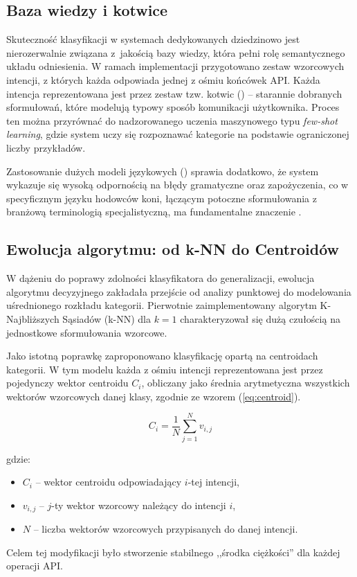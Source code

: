 \subsection*{Baza wiedzy i kotwice}

Skuteczność klasyfikacji w systemach dedykowanych dziedzinowo jest nierozerwalnie związana z~jakością bazy wiedzy, która pełni rolę semantycznego układu odniesienia. W ramach implementacji przygotowano zestaw wzorcowych intencji, z których każda odpowiada jednej z ośmiu końcówek API. Każda intencja reprezentowana jest przez zestaw tzw. kotwic () -- starannie dobranych sformułowań, które modelują typowy sposób komunikacji użytkownika. Proces ten można przyrównać do nadzorowanego uczenia maszynowego typu \textit{few-shot learning}, gdzie system uczy się rozpoznawać kategorie na podstawie ograniczonej liczby przykładów.

Zastosowanie {dużych modeli językowych} () sprawia dodatkowo, że system wykazuje się wysoką odpornością na błędy gramatyczne oraz zapożyczenia, co w specyficznym języku hodowców koni, łączącym potoczne sformułowania z branżową terminologią specjalistyczną, ma fundamentalne znaczenie \cite{wang2022}.

\subsection*{Ewolucja algorytmu: od k-NN do Centroidów}

W dążeniu do poprawy zdolności klasyfikatora do generalizacji, ewolucja algorytmu decyzyjnego zakładała przejście od analizy punktowej do modelowania uśrednionego rozkładu kategorii. Pierwotnie zaimplementowany algorytm K-Najbliższych Sąsiadów (k-NN) dla $k=1$ charakteryzował się dużą czułością na jednostkowe sformułowania wzorcowe.

Jako istotną poprawkę zaproponowano klasyfikację opartą na centroidach kategorii. W tym modelu każda z ośmiu intencji reprezentowana jest przez pojedynczy wektor centroidu $C_i$, obliczany jako średnia arytmetyczna wszystkich wektorów wzorcowych danej klasy, zgodnie ze wzorem (\ref{eq:centroid}).

\begin{equation}
    C_i = \frac{1}{N} \sum_{j=1}^{N} v_{i,j}
    \label{eq:centroid}
\end{equation}

\noindent gdzie:
\begin{itemize}
    \item $C_i$ -- wektor centroidu odpowiadający $i$-tej intencji,
    \item $v_{i,j}$ -- $j$-ty wektor wzorcowy należący do intencji $i$,
    \item $N$ -- liczba wektorów wzorcowych przypisanych do danej intencji.
\end{itemize}
Celem tej modyfikacji było stworzenie stabilnego ,,środka ciężkości'' dla każdej operacji API.

